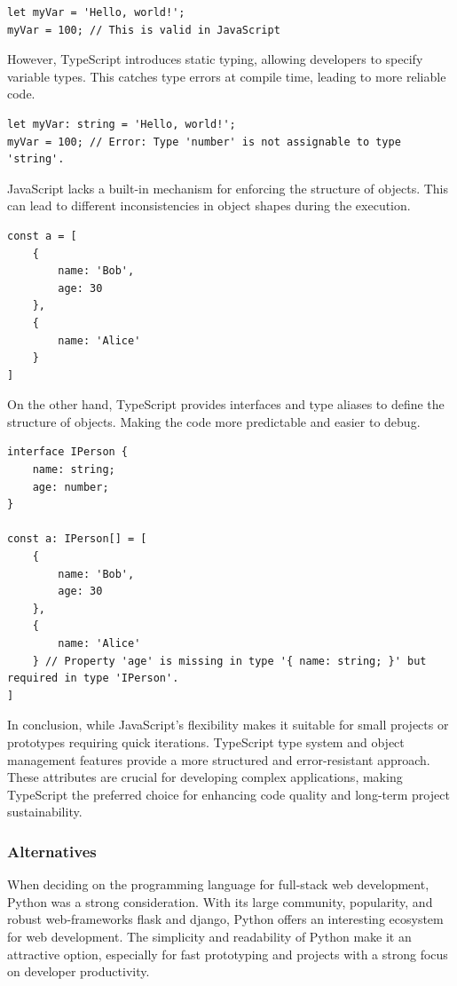 \medskip
\begin{lstlisting}[caption=JavaScript dynamic typing example]
let myVar = 'Hello, world!';
myVar = 100; // This is valid in JavaScript
\end{lstlisting}

However, TypeScript introduces static typing, allowing developers to specify variable types. This catches type errors at compile time, leading to more reliable code.
\medskip
\begin{lstlisting}[caption=TypeScript static typing example]
let myVar: string = 'Hello, world!';
myVar = 100; // Error: Type 'number' is not assignable to type 'string'.
\end{lstlisting}

JavaScript lacks a built-in mechanism for enforcing the structure of objects. This can lead to different inconsistencies in object shapes during the execution.

\medskip
\begin{lstlisting}[caption=JavaScript different object shapes]
const a = [
    { 
        name: 'Bob', 
        age: 30 
    }, 
    { 
        name: 'Alice' 
    }
]
\end{lstlisting}

On the other hand, TypeScript provides interfaces and type aliases to define the structure of objects.
Making the code more predictable and easier to debug.

\medskip
\begin{lstlisting}[caption=TypeScript enforcing object shape]
interface IPerson {
    name: string;
    age: number;
}

const a: IPerson[] = [
    { 
        name: 'Bob', 
        age: 30 
    }, 
    { 
        name: 'Alice' 
    } // Property 'age' is missing in type '{ name: string; }' but required in type 'IPerson'.
]
\end{lstlisting}

% 

In conclusion, while JavaScript's flexibility makes it suitable for small projects or prototypes requiring quick iterations.
TypeScript type system and object management features provide a more structured and error-resistant approach.
These attributes are crucial for developing complex applications, making TypeScript the preferred choice for enhancing code quality and long-term project sustainability.

\subsubsection{Alternatives}
When deciding on the programming language for full-stack web development, Python was a strong consideration.
With its large community, popularity, and robust web-frameworks \gls{flask} and \gls{django}, Python offers an interesting ecosystem for web development.
The simplicity and readability of Python make it an attractive option, especially for fast prototyping and projects with a strong focus on developer productivity.

